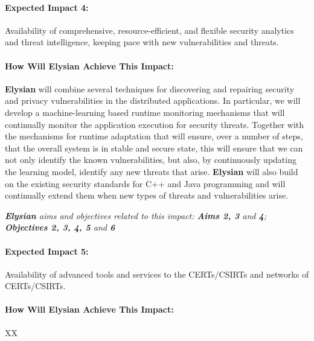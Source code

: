 \documentclass[a4paper,11pt]{article}
\newcommand{\project}[1]{\textbf{#1}\xspace}
\newcommand{\SECURITY}{\project{Elysian}}
\newcommand{\TheProject}{\SECURITY}
\begin{document}
\begin{mdframed}[backgroundcolor=blue!5]
\paragraph{Expected Impact 4:}
Availability of comprehensive, resource-efficient, and flexible security analytics and threat intelligence, keeping pace with new vulnerabilities and threats.
\end{mdframed}

\begin{mdframed}[backgroundcolor=gray!10]
\paragraph{How Will \TheProject{} Achieve This Impact:}
\TheProject{} will combine several techniques for discovering and repairing security and privacy vulnerabilities in the distributed applications. In particular, we will develop a machine-learning based runtime monitoring mechanisms that will continually monitor the application execution for security threats. Together with the mechanisms for runtime adaptation that will ensure, over a number of steps, that the overall system is in stable and secure state, this will ensure that we can not only identify the known vulnerabilities, but also, by continuously updating the learning model, identify any new threats that arise. \TheProject{} will also build on the existing security standards for C++ and Java programming and will continually extend them when new types of threats and vulnerabilities arise.

\emph{\TheProject{} aims and objectives related to this impact: \textbf{Aims 2, 3}  and \textbf{4}; \textbf{Objectives 2, 3, 4, 5} and \textbf{6} }


\end{mdframed}

\begin{mdframed}[backgroundcolor=blue!5]
\paragraph{Expected Impact 5:}
Availability of advanced tools and services to the CERTs/CSIRTs and networks of CERTs/CSIRTs.
\end{mdframed}

\begin{mdframed}[backgroundcolor=gray!10]
\paragraph{How Will \TheProject{} Achieve This Impact:}
XX
\end{mdframed}
\end{document}
